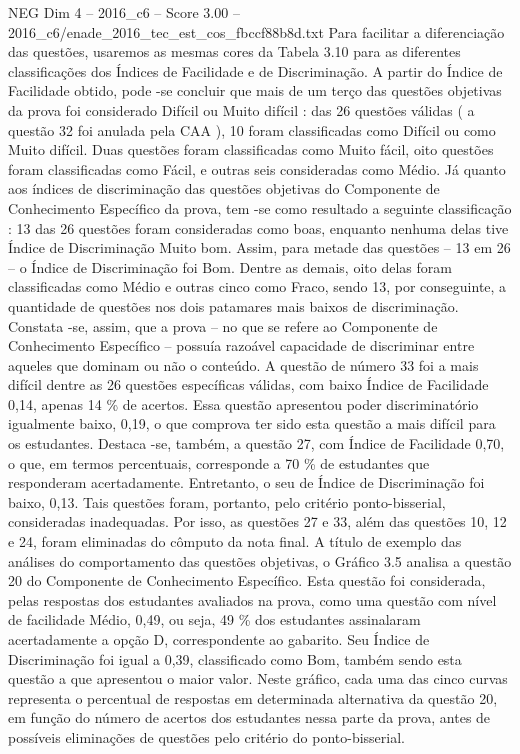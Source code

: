 \begin{textsample}{NEG Dim 4 – 2016\_c6 – Score 3.00 – 2016\_c6/enade\_2016\_tec\_est\_cos\_fbccf88b8d.txt}
Para facilitar a diferenciação das questões, usaremos as mesmas cores da Tabela 3.10 para as diferentes classificações dos Índices de Facilidade e de Discriminação.
A partir do Índice de Facilidade obtido, pode -se concluir que mais de um terço das questões objetivas da prova foi considerado Difícil ou Muito difícil : das 26 questões válidas ( a questão 32 foi anulada pela CAA ), 10 foram classificadas como Difícil ou como Muito difícil.
Duas questões foram classificadas como Muito fácil, oito questões foram classificadas como Fácil, e outras seis consideradas como Médio.
Já quanto aos índices de discriminação das questões objetivas do Componente de Conhecimento Específico da prova, tem -se como resultado a seguinte classificação : 13 das 26 questões foram consideradas como boas, enquanto nenhuma delas tive Índice de Discriminação Muito bom.
Assim, para metade das questões – 13 em 26 – o Índice de Discriminação foi Bom.
Dentre as demais, oito delas foram classificadas como Médio e outras cinco como Fraco, sendo 13, por conseguinte, a quantidade de questões nos dois patamares mais baixos de discriminação.
Constata -se, assim, que a prova – no que se refere ao Componente de Conhecimento Específico – possuía razoável capacidade de discriminar entre aqueles que dominam ou não o conteúdo.
A questão de número 33 foi a mais difícil dentre as 26 questões específicas válidas, com baixo Índice de Facilidade 0,14, apenas 14 \% de acertos.
Essa questão apresentou poder discriminatório igualmente baixo, 0,19, o que comprova ter sido esta questão a mais difícil para os estudantes.
Destaca -se, também, a questão 27, com Índice de Facilidade 0,70, o que, em termos percentuais, corresponde a 70 \% de estudantes que responderam acertadamente.
Entretanto, o seu de Índice de Discriminação foi baixo, 0,13.
Tais questões foram, portanto, pelo critério ponto-bisserial, consideradas inadequadas.
Por isso, as questões 27 e 33, além das questões 10, 12 e 24, foram eliminadas do cômputo da nota final.
A título de exemplo das análises do comportamento das questões objetivas, o Gráfico 3.5 analisa a questão 20 do Componente de Conhecimento Específico.
Esta questão foi considerada, pelas respostas dos estudantes avaliados na prova, como uma questão com nível de facilidade Médio, 0,49, ou seja, 49 \% dos estudantes assinalaram acertadamente a opção D, correspondente ao gabarito.
Seu Índice de Discriminação foi igual a 0,39, classificado como Bom, também sendo esta questão a que apresentou o maior valor.
Neste gráfico, cada uma das cinco curvas representa o percentual de respostas em determinada alternativa da questão 20, em função do número de acertos dos estudantes nessa parte da prova, antes de possíveis eliminações de questões pelo critério do ponto-bisserial.

\end{textsample}
